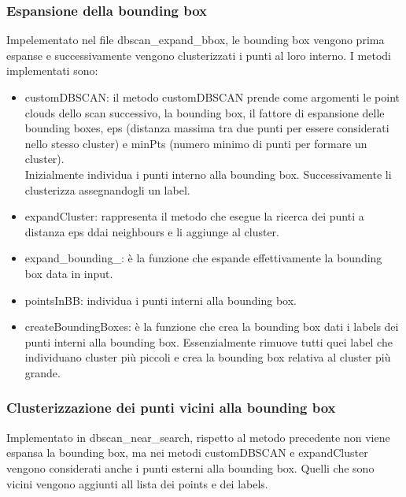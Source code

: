 \documentclass[italian]{article}
\begin{document}
\subsubsection{Espansione della bounding box}
Impelementato nel file dbscan\_expand\_bbox, le bounding box vengono prima espanse e successivamente vengono clusterizzati i punti al loro interno.
I metodi implementati sono:
\begin{itemize}
	\item customDBSCAN: il metodo customDBSCAN prende come argomenti le point clouds dello scan successivo, la bounding box, il fattore di espansione delle bounding boxes, eps (distanza massima tra due punti per essere considerati nello stesso cluster) e minPts (numero minimo di punti per formare un cluster).\\ Inizialmente individua i punti interno alla bounding box. Successivamente li clusterizza assegnandogli un label.
	\item expandCluster: rappresenta il metodo che esegue la ricerca dei punti a distanza eps ddai neighbours e li aggiunge al cluster.
	\item expand\_bounding\_: è la funzione che espande effettivamente la bounding box data in input.
	\item pointsInBB: individua i punti interni alla bounding box.
	\item createBoundingBoxes: è la funzione che crea la bounding box dati i labels dei punti interni alla bounding box. Essenzialmente rimuove tutti quei label che individuano cluster più piccoli e crea la bounding box relativa al cluster più grande.
\end{itemize}
\subsubsection{Clusterizzazione dei punti vicini alla bounding box}
Implementato in dbscan\_near\_search, rispetto al metodo precedente non viene espansa la bounding box, ma nei metodi customDBSCAN e expandCluster vengono considerati anche i punti esterni alla bounding box. Quelli che sono vicini vengono aggiunti all lista dei points e dei labels.
\end{document}
